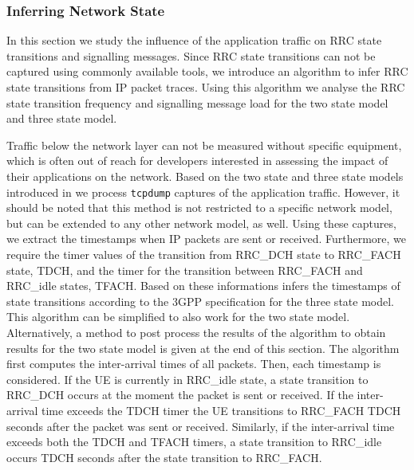 \subsubsection*{Inferring Network State}\label{sec:network:network_traces:performance_evaluation:inferring_network_state}
In this section we study the influence of the application traffic on \gls{RRC} state transitions and signalling messages.
Since \gls{RRC} state transitions can not be captured using commonly available tools, we introduce an algorithm to infer \gls{RRC} state transitions from \gls{IP} packet traces.
Using this algorithm we analyse the \gls{RRC} state transition frequency and signalling message load for the two state model and three state model.

Traffic below the network layer can not be measured without specific equipment, which is often out of reach for developers interested in assessing the impact of their applications on the network.
Based on the two state and three state models introduced in  we process \texttt{tcpdump} captures of the application traffic.
However, it should be noted that this method is not restricted to a specific network model, but can be extended to any other network model, as well.
Using these captures, we extract the timestamps when \gls{IP} packets are sent or received.
Furthermore, we require the timer values of the transition from \gls{RRC_DCH} state to \gls{RRC_FACH} state, \gls{TDCH}, and the timer for the transition between \gls{RRC_FACH} and \gls{RRC_idle} states, \gls{TFACH}.
Based on these informations  infers the timestamps of state transitions according to the \gls{3GPP} specification \cite{3GPP_RRC_Spec} for the three state model.
This algorithm can be simplified to also work for the two state model. 
Alternatively, a method to post process the results of the algorithm to obtain results for the two state model is given at the end of this section.
The algorithm first computes the inter-arrival times of all packets.
Then, each timestamp is considered.
If the \gls{UE} is currently in \gls{RRC_idle} state, a state transition to \gls{RRC_DCH} occurs at the moment the packet is sent or received.
If the inter-arrival time exceeds the \gls{TDCH} timer the \gls{UE} transitions to \gls{RRC_FACH} \gls{TDCH} seconds after the packet was sent or received.
Similarly, if the inter-arrival time exceeds both the \gls{TDCH} and \gls{TFACH} timers, a state transition to \gls{RRC_idle} occurs \gls{TDCH} seconds after the state transition to \gls{RRC_FACH}.

